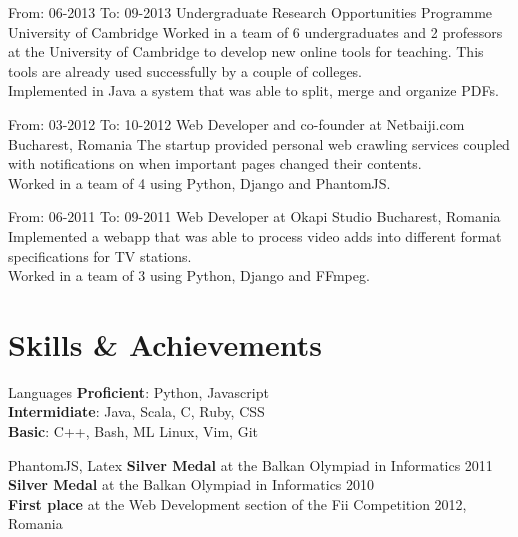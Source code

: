 \documentclass[]{friggeri-cv}
\begin{document}
\begin{entrylist}

  \entry
  {From: 06-2013} 
  {To: 09-2013}
  {Undergraduate Research Opportunities Programme}
  {University of Cambridge}
  {
    Worked in a team of 6 undergraduates and 2 professors at the University of Cambridge to develop new online tools
    for teaching.
    This tools are already used successfully by a couple of colleges.\\

    Implemented in Java a system that was able to split, merge and organize PDFs.
  }

  \entry
  {From: 03-2012}
  {To: 10-2012}
  {Web Developer and co-founder at Netbaiji.com}
  {Bucharest, Romania}
  {
    The startup provided personal web crawling services coupled with notifications on when important pages changed
    their contents. \\  

    Worked in a team of 4 using Python, Django and PhantomJS.
  }

  \entry
  {From: 06-2011}
  {To: 09-2011}
  {Web Developer at Okapi Studio}
  {Bucharest, Romania}
  {
    Implemented a webapp that was able to process video adds into different format specifications for TV stations. \\

    Worked in a team of 3 using Python, Django and FFmpeg.
  }

\end{entrylist}

\section{Skills \& Achievements}
\begin{entrylist}
  \simpleentry
  {Languages}
  {
    \textbf{Proficient}:  Python, Javascript \\
    \textbf{Intermidiate}:  Java, Scala, C, Ruby, CSS \\
    \textbf{Basic}:  C++, Bash, ML
  }
   {
    Linux, Vim, Git
  }

   {
    PhantomJS, Latex
  }
   {
    \textbf{Silver Medal} at the Balkan Olympiad in Informatics 2011 \\
    \textbf{Silver Medal} at the Balkan Olympiad in Informatics 2010 \\
    \textbf{First place} at the Web Development section of the Fii Competition 2012, Romania
  }
\end{entrylist}
\end{document}
